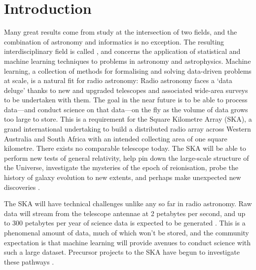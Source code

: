 \chapter{Introduction}
\label{cha:intro}



Many great results come from study at the intersection of two fields, and the combination of astronomy and informatics is no exception. The resulting interdisciplinary field is called , and concerns the application of statistical and machine learning techniques to problems in astronomy and astrophysics.
Machine learning, a collection of methods for formalising and solving data-driven problems at scale, is a natural fit for radio astronomy: Radio astronomy faces a `data deluge' thanks to new and upgraded telescopes and associated wide-area surveys to be undertaken with them. The goal in the near future is to be able to process data---and conduct science on that data---on the fly as the volume of data grows too large to store. This is a requirement for the Square Kilometre Array (SKA), a grand international undertaking to build a distributed radio array across Western Australia and South Africa with an intended collecting area of one square kilometre. There exists no comparable telescope today. The SKA will be able to perform new tests of general relativity, help pin down the large-scale structure of the Universe, investigate the mysteries of the epoch of reionisation, probe the history of galaxy evolution to new extents, and perhaps make unexpected new discoveries \citep{diamond_ska_2017}.

The SKA will have technical challenges unlike any so far in radio astronomy. Raw data will stream from the telescope antennae at 2 petabytes per second, and up to 300 petabytes per year of science data is expected to be generated \citep{diamond_ska_2017}. This is a phenomenal amount of data, much of which won't be stored, and the community expectation is that machine learning will provide avenues to conduct science with such a large dataset. Precursor projects to the SKA have begun to investigate these pathways \citep[e.g.][]{bonaldi_square_2020,kapinska_emu_2020,mostert_unveiling_2020}.

